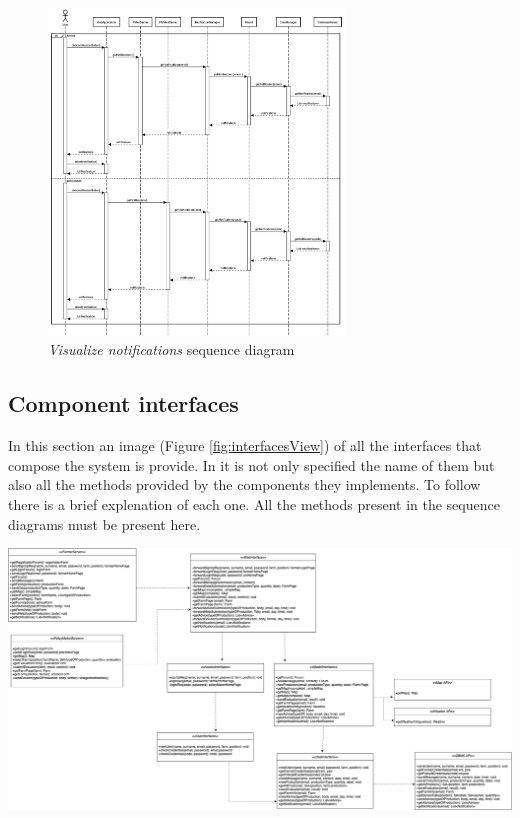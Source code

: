 \begin{enumerate}
\begin{figure}[H]
\begin{center}
        \includegraphics[width=0.7\textwidth]{sequence/viewNotifications.png}
        \caption{\emph{Visualize notifications} sequence diagram}
        \label{fig:sequence9}
        \end{center}
    \end{figure}
    
\end{enumerate}


\subsection{Component interfaces}
In this section an image (Figure \ref{fig:interfacesView}) of all the interfaces that compose the system is provide. In it is not only specified the name of them but also all the methods provided by the components they implements. To follow there is a brief explenation of each one. All the methods present in the sequence diagrams must be present here. 

\begin{adjustbox}{angle=90,center,caption=\emph{Interfaces} view,nofloat=figure}
    \includegraphics[width=1.6\linewidth]{images/Interfaces.png}
    \label{fig:interfacesView}
\end{adjustbox}



